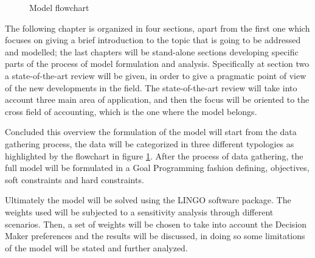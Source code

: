 \begin{doublespace}
\begin{figure}
\centering
{}
\caption{Model flowchart}
\label{fig:flowchart}
\end{figure}

The following chapter is organized in four sections, apart from the first one which focuses on giving a brief introduction to the topic that is going to be addressed and modelled; the last chapters will be stand-alone sections developing specific parts of the process of model formulation and analysis. Specifically at section two a state-of-the-art review will be given, in order to give a pragmatic point of view of the new developments in the field. The state-of-the-art review will take into account three main area of application, and then the focus will be oriented to the cross field of accounting, which is the one where the model belongs. 

Concluded this overview the formulation of the model will start from the data gathering process, the data will be categorized in three different typologies as highlighted by the flowchart in figure \ref{fig:flowchart}. After the process of data gathering, the full model will be formulated in a Goal Programming fashion defining, objectives, soft constraints and hard constraints.

Ultimately the model will be solved using the LINGO software package. The weights used will be subjected to a sensitivity analysis through different scenarios. Then, a set of weights will be chosen to take into account the Decision Maker preferences and the results will be discussed, in doing so some limitations of the model will be stated and further analyzed.


\end{doublespace}
